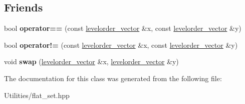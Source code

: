 \subsection*{Friends}
\begin{DoxyCompactItemize}
\item 
\hypertarget{classlevelorder__vector_adc84f538ec738d4d9526a404b29985be}{bool {\bfseries operator==} (const \hyperlink{classlevelorder__vector}{levelorder\+\_\+vector} \&x, const \hyperlink{classlevelorder__vector}{levelorder\+\_\+vector} \&y)}\label{classlevelorder__vector_adc84f538ec738d4d9526a404b29985be}

\item 
\hypertarget{classlevelorder__vector_ae62086a3d9f47df4b3a794f705be5124}{bool {\bfseries operator!=} (const \hyperlink{classlevelorder__vector}{levelorder\+\_\+vector} \&x, const \hyperlink{classlevelorder__vector}{levelorder\+\_\+vector} \&y)}\label{classlevelorder__vector_ae62086a3d9f47df4b3a794f705be5124}

\item 
\hypertarget{classlevelorder__vector_a8a40c8b3cb31bf40c2142f514f4ce125}{void {\bfseries swap} (\hyperlink{classlevelorder__vector}{levelorder\+\_\+vector} \&x, \hyperlink{classlevelorder__vector}{levelorder\+\_\+vector} \&y)}\label{classlevelorder__vector_a8a40c8b3cb31bf40c2142f514f4ce125}

\end{DoxyCompactItemize}


The documentation for this class was generated from the following file\+:\begin{DoxyCompactItemize}
\item 
Utilities/flat\+\_\+set.\+hpp\end{DoxyCompactItemize}
